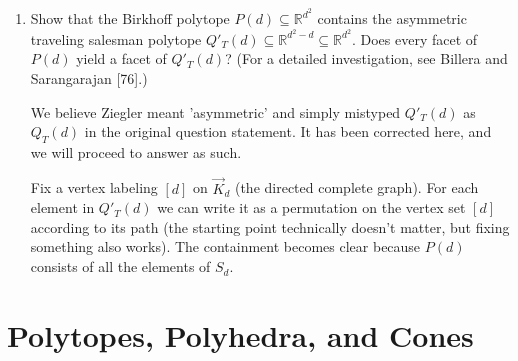 \documentclass{article}
\begin{document}
\begin{enumerate}
\item Show that the Birkhoff polytope $P(d) \subseteq \mathbb{R}^{d^{2}}$ contains the asymmetric traveling salesman polytope $Q'_{T}(d) \subseteq \mathbb{R}^{d^{2}-d} \subseteq \mathbb{R}^{d^{2}}$. Does every facet of $P(d)$ yield a facet of $Q'_{T}(d)$?
(For a detailed investigation, see Billera and Sarangarajan [76].)

\begin{remark}
    We believe Ziegler meant 'asymmetric' and simply mistyped $Q'_T(d)$ as $Q_T(d)$ in the original question statement. It has been corrected here, and we will proceed to answer as such.
\end{remark}

\begin{solution}
    Fix a vertex labeling $[d]$ on $\vec K_d$ (the directed complete graph). For each element in $Q'_T(d)$ we can write it as a permutation on the vertex set $[d]$ according to its path (the starting point technically doesn't matter, but fixing something also works). The containment becomes clear because $P(d)$ consists of all the elements of $S_d$.

\end{solution}
\end{enumerate}
\bigskip
\section{Polytopes, Polyhedra, and Cones}
\end{document}
